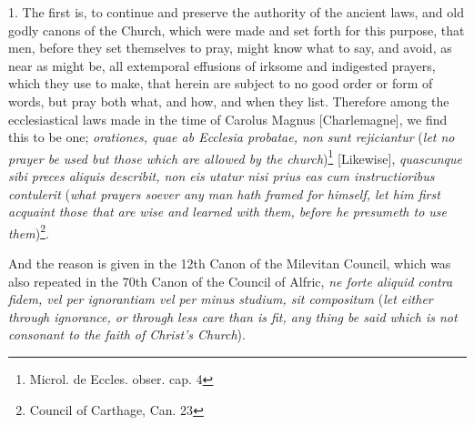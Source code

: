 \documentclass{article}
\begin{document}
1. The first is, to continue and preserve the authority of the
ancient laws, and old
godly canons of the Church, which were made and set forth for this
purpose, that men,
before they set themselves to pray, might know what to say, and
avoid, as near as might be,
all extemporal effusions of irksome and indigested prayers, which they
use to make, that herein
are subject to no good order or form of words, but pray both what,
and how, and when they list.
Therefore among the ecclesiastical laws made in the time of Carolus
Magnus [Charlemagne],
we find this to be one; \textit{orationes, quae ab Ecclesia probatae,
non sunt rejiciantur}
(\textit{let no prayer be used but those which are allowed by the
church})\footnote{Microl. de Eccles. obser. cap. 4}
[Likewise], \textit{quascunque sibi preces aliquis describit, non eis
  utatur nisi prius
eas cum instructioribus contulerit} (\textit{what prayers soever any
    man hath framed
    for himself, let him first acquaint those that are wise and
    learned with them, before he presumeth
to use them})\footnote{Council of Carthage, Can. 23}.

And the reason is given in the 12th Canon of the Milevitan Council,
which was also
repeated in the 70th Canon of the Council of Alfric, \textit{ne forte aliquid
contra fidem, vel per ignorantiam vel per minus studium, sit compositum}
(\textit{let either through ignorance, or through less care than is
    fit, any thing be said
which is not consonant to the faith of Christ's Church}).
\end{document}

